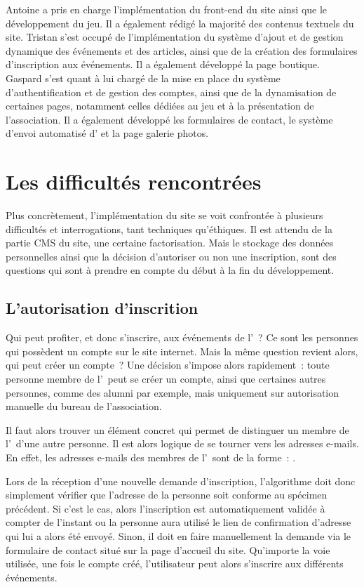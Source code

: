 Antoine a pris en charge l’implémentation du front-end du site ainsi que le développement du jeu. Il a également rédigé la majorité des contenus textuels du site.
Tristan s’est occupé de l’implémentation du système d’ajout et de gestion dynamique des événements et des articles, ainsi que de la création des formulaires d’inscription aux événements. Il a également développé la page boutique.
Gaspard s’est quant à lui chargé de la mise en place du système d’authentification et de gestion des comptes, ainsi que de la dynamisation de certaines pages, notamment celles dédiées au jeu et à la présentation de l’association. Il a également développé les formulaires de contact, le système d’envoi automatisé d’ et la page galerie photos.

\section{Les difficultés rencontrées}
\label{sec:difficultes}

Plus concrètement, l'implémentation du site se voit confrontée à plusieurs difficultés et interrogations, tant techniques qu'éthiques. Il est attendu de la partie CMS du site, une certaine factorisation. Mais le stockage des données personnelles ainsi que la décision d'autoriser ou non une inscription, sont des questions qui sont à prendre en compte du début à la fin du développement.

\subsection{L'autorisation d'inscrition}
\label{subsec:autorisation-inscription}

Qui peut profiter, et donc s'inscrire, aux événements de l'\ofni~? Ce sont les personnes qui possèdent un compte sur le site internet. Mais la même question revient alors, qui peut créer un compte~? Une décision s'impose alors rapidement~: toute personne membre de l'\univ\ peut se créer un compte, ainsi que certaines autres personnes, comme des alumni par exemple, mais uniquement sur autorisation manuelle du bureau de l'association.

Il faut alors trouver un élément concret qui permet de distinguer un membre de l'\univ\ d'une autre personne. Il est alors logique de se tourner vers les adresses e-mails. En effet, les adresses e-mails des membres de l'\univ\ sont de la forme~: .

Lors de la réception d'une nouvelle demande d'inscription, l'algorithme doit donc simplement vérifier que l'adresse  de la personne soit conforme au spécimen précédent. Si c'est le cas, alors l'inscription est automatiquement validée à compter de l'instant ou la personne aura utilisé le lien de confirmation d'adresse qui lui a alors été envoyé. Sinon, il doit en faire manuellement la demande via le formulaire de contact situé sur la page d'accueil du site. Qu'importe la voie utilisée, une fois le compte créé, l'utilisateur peut alors s'inscrire aux différents événements.

